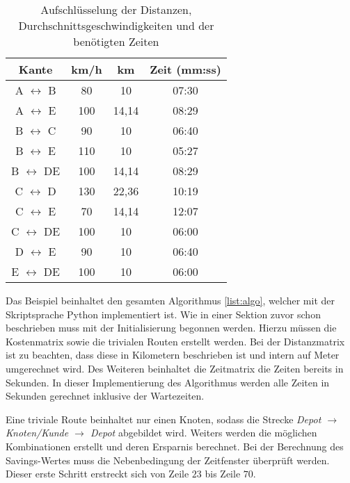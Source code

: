 \begin{table}[htb]%
\centering
\begin{tabular}{c|c|c|c}
Kante & km/h & km & Zeit (mm:ss) \\ 
\hline 
A $\leftrightarrow$ B & 80 & 10 & 07:30 \\ 
A $\leftrightarrow$ E & 100 & 14,14 & 08:29 \\ 
B $\leftrightarrow$ C & 90 & 10 & 06:40 \\ 
B $\leftrightarrow$ E & 110 & 10 & 05:27 \\ 
B $\leftrightarrow$ DE & 100 & 14,14 & 08:29 \\ 
C $\leftrightarrow$ D & 130 & 22,36 & 10:19 \\ 
C $\leftrightarrow$ E & 70 & 14,14 & 12:07 \\ 
C $\leftrightarrow$ DE & 100 & 10 & 06:00 \\ 
D $\leftrightarrow$ E & 90 & 10 & 06:40 \\ 
E $\leftrightarrow$ DE & 100 & 10 & 06:00 \\ 
\end{tabular} 
\caption{Aufschlüsselung der Distanzen, Durchschnittsgeschwindigkeiten und der benötigten Zeiten}
\label{tab:edgeValues}
\end{table}
Das Beispiel beinhaltet den gesamten Algorithmus \ref{list:algo}, welcher mit der Skriptsprache Python implementiert ist. 
Wie in einer Sektion zuvor schon beschrieben muss mit der Initialisierung begonnen werden. 
Hierzu müssen die Kostenmatrix sowie die trivialen Routen erstellt werden. 
Bei der Distanzmatrix ist zu beachten, dass diese in Kilometern beschrieben ist und intern auf Meter umgerechnet wird. 
Des Weiteren beinhaltet die Zeitmatrix die Zeiten bereits in Sekunden. 
In dieser Implementierung des Algorithmus werden alle Zeiten in Sekunden gerechnet inklusive der Wartezeiten. 

\noindent
Eine triviale Route beinhaltet nur einen Knoten, sodass die Strecke \textit{Depot $\rightarrow$ Knoten/Kunde $\rightarrow$ Depot} abgebildet wird. 
Weiters werden die möglichen Kombinationen erstellt und deren Ersparnis berechnet. 
Bei der Berechnung des Savings-Wertes muss die Nebenbedingung der Zeitfenster überprüft werden. 
Dieser erste Schritt erstreckt sich von Zeile $23$ bis Zeile $70$. 

